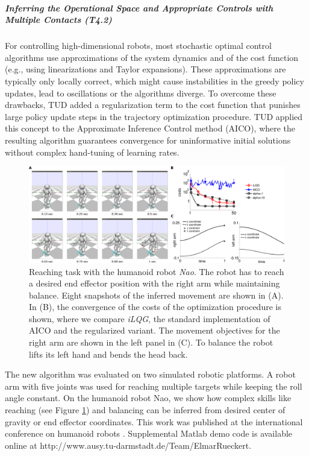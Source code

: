 \subparagraph{Inferring the Operational Space and Appropriate Controls with Multiple Contacts (T4.2)}%

For controlling high-dimensional robots, most stochastic optimal control
algorithms use approximations of the system dynamics and of the cost function
(e.g., using linearizations and Taylor expansions). These approximations are
typically only locally correct, which might cause instabilities in the greedy
policy updates, lead to oscillations or the algorithms diverge. To overcome
these drawbacks, TUD added a regularization term to the cost function that punishes
large policy update steps in the trajectory optimization procedure. TUD applied
this concept to the Approximate Inference Control method (AICO), where the
resulting algorithm guarantees convergence for uninformative initial solutions
without complex hand-tuning of learning rates. 

\begin{figure}[t]
  \begin{center}
  \includegraphics[width=\linewidth]{./sections/WP4/pics_elmar/NaoReachingTask.png}
  \end{center}
  \caption{Reaching task with the humanoid robot \textit{Nao}. The robot has to
reach  a desired end effector position with the right arm while maintaining
balance. Eight snapshots of the inferred movement are shown in (A). In (B), the
convergence of the costs of the optimization procedure is shown, where we
compare \textit{iLQG}, the standard implementation of AICO and the regularized
variant. The movement objectives for the right arm are shown in the left panel
in (C). To balance the robot lifts its left hand and bends the head back.}
  \label{fig:naoReachingTask}
  \end{figure}

The new algorithm was evaluated on
two simulated robotic platforms. A robot arm with five joints was used for
reaching multiple targets while keeping the roll angle constant. On the humanoid
robot Nao, we show how complex skills like reaching (see Figure \ref{fig:naoReachingTask}) and balancing can be
inferred from desired center of gravity or end effector coordinates. This work was published at 
the international conference on humanoid robots \cite{Rueckert2014}. 
Supplemental Matlab demo code is available online at http://www.ausy.tu-darmstadt.de/Team/ElmarRueckert.

